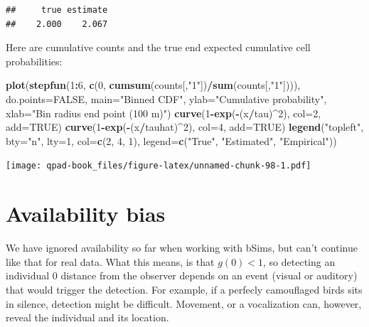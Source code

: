\documentclass[12pt,]{book}
\newenvironment{Shaded}{\begin{snugshade}}{\end{snugshade}}
\newcommand{\DataTypeTok}[1]{\textcolor[rgb]{0.13,0.29,0.53}{#1}}
\newcommand{\DecValTok}[1]{\textcolor[rgb]{0.00,0.00,0.81}{#1}}
\newcommand{\KeywordTok}[1]{\textcolor[rgb]{0.13,0.29,0.53}{\textbf{#1}}}
\newcommand{\NormalTok}[1]{#1}
\newcommand{\OperatorTok}[1]{\textcolor[rgb]{0.81,0.36,0.00}{\textbf{#1}}}
\newcommand{\OtherTok}[1]{\textcolor[rgb]{0.56,0.35,0.01}{#1}}
\newcommand{\StringTok}[1]{\textcolor[rgb]{0.31,0.60,0.02}{#1}}
\begin{document}
\begin{verbatim}
##     true estimate 
##    2.000    2.067
\end{verbatim}

Here are cumulative counts and the true end expected
cumulative cell probabilities:

\begin{Shaded}
\begin{Highlighting}[]
\KeywordTok{plot}\NormalTok{(}\KeywordTok{stepfun}\NormalTok{(}\DecValTok{1}\OperatorTok{:}\DecValTok{6}\NormalTok{, }\KeywordTok{c}\NormalTok{(}\DecValTok{0}\NormalTok{, }\KeywordTok{cumsum}\NormalTok{(counts[,}\StringTok{"1"}\NormalTok{])}\OperatorTok{/}\KeywordTok{sum}\NormalTok{(counts[,}\StringTok{"1"}\NormalTok{]))), }
  \DataTypeTok{do.points=}\OtherTok{FALSE}\NormalTok{, }\DataTypeTok{main=}\StringTok{"Binned CDF"}\NormalTok{,}
  \DataTypeTok{ylab=}\StringTok{"Cumulative probability"}\NormalTok{, }
  \DataTypeTok{xlab=}\StringTok{"Bin radius end point (100 m)"}\NormalTok{)}
\KeywordTok{curve}\NormalTok{(}\DecValTok{1}\OperatorTok{-}\KeywordTok{exp}\NormalTok{(}\OperatorTok{-}\NormalTok{(x}\OperatorTok{/}\NormalTok{tau)}\OperatorTok{^}\DecValTok{2}\NormalTok{), }\DataTypeTok{col=}\DecValTok{2}\NormalTok{, }\DataTypeTok{add=}\OtherTok{TRUE}\NormalTok{)}
\KeywordTok{curve}\NormalTok{(}\DecValTok{1}\OperatorTok{-}\KeywordTok{exp}\NormalTok{(}\OperatorTok{-}\NormalTok{(x}\OperatorTok{/}\NormalTok{tauhat)}\OperatorTok{^}\DecValTok{2}\NormalTok{), }\DataTypeTok{col=}\DecValTok{4}\NormalTok{, }\DataTypeTok{add=}\OtherTok{TRUE}\NormalTok{)}
\KeywordTok{legend}\NormalTok{(}\StringTok{"topleft"}\NormalTok{, }\DataTypeTok{bty=}\StringTok{"n"}\NormalTok{, }\DataTypeTok{lty=}\DecValTok{1}\NormalTok{, }\DataTypeTok{col=}\KeywordTok{c}\NormalTok{(}\DecValTok{2}\NormalTok{, }\DecValTok{4}\NormalTok{, }\DecValTok{1}\NormalTok{), }
  \DataTypeTok{legend=}\KeywordTok{c}\NormalTok{(}\StringTok{"True"}\NormalTok{, }\StringTok{"Estimated"}\NormalTok{, }\StringTok{"Empirical"}\NormalTok{))}
\end{Highlighting}
\end{Shaded}

\texttt{[image: qpad-book\_files/figure-latex/unnamed-chunk-98-1.pdf]}

\hypertarget{availability-bias}{%
\section{Availability bias}\label{availability-bias}}

We have ignored availability so far when working with bSims,
but can't continue like that for real data.
What this means, is that \(g(0) < 1\), so detecting
an individual 0 distance from the observer depends on
an event (visual or auditory) that would trigger the detection.
For example, if a perfecly camouflaged birds sits in silence,
detection might be difficult. Movement, or a vocalization
can, however, reveal the individual and its location.
\end{document}
